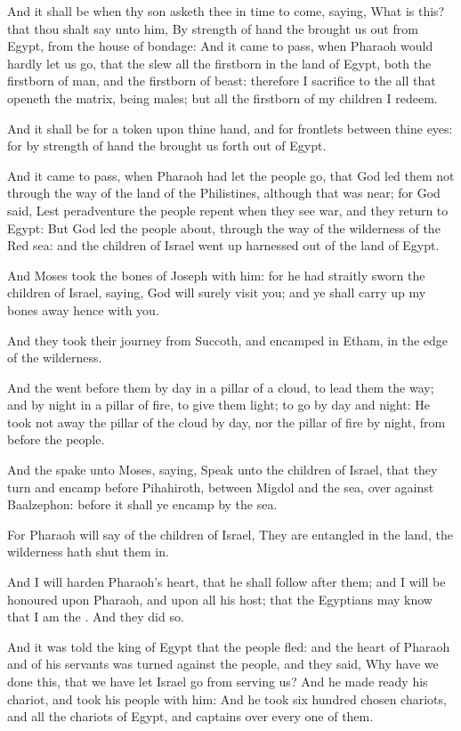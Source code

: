 \Verse And it shall be when thy son asketh thee in time to come, saying, What is this? that thou shalt say unto him, By strength of hand the \LORD brought us out from Egypt, from the house of bondage: \Verse And it came to pass, when Pharaoh would hardly let us go, that the \LORD slew all the firstborn in the land of Egypt, both the firstborn of man, and the firstborn of beast: therefore I sacrifice to the \LORD all that openeth the matrix, being males; but all the firstborn of my children I redeem.

\Verse And it shall be for a token upon thine hand, and for frontlets between thine eyes: for by strength of hand the \LORD brought us forth out of Egypt.

\Verse And it came to pass, when Pharaoh had let the people go, that God led them not through the way of the land of the Philistines, although that was near; for God said, Lest peradventure the people repent when they see war, and they return to Egypt: \Verse But God led the people about, through the way of the wilderness of the Red sea: and the children of Israel went up harnessed out of the land of Egypt.

\Verse And Moses took the bones of Joseph with him: for he had straitly sworn the children of Israel, saying, God will surely visit you; and ye shall carry up my bones away hence with you.

\Verse And they took their journey from Succoth, and encamped in Etham, in the edge of the wilderness.

\Verse And the \LORD went before them by day in a pillar of a cloud, to lead them the way; and by night in a pillar of fire, to give them light; to go by day and night: \Verse He took not away the pillar of the cloud by day, nor the pillar of fire by night, from before the people.

\Chapter
\Verse And the \LORD spake unto Moses, saying, \Verse Speak unto the children of Israel, that they turn and encamp before Pihahiroth, between Migdol and the sea, over against Baalzephon: before it shall ye encamp by the sea.

\Verse For Pharaoh will say of the children of Israel, They are entangled in the land, the wilderness hath shut them in.

\Verse And I will harden Pharaoh's heart, that he shall follow after them; and I will be honoured upon Pharaoh, and upon all his host; that the Egyptians may know that I am the \LORD. And they did so.

\Verse And it was told the king of Egypt that the people fled: and the heart of Pharaoh and of his servants was turned against the people, and they said, Why have we done this, that we have let Israel go from serving us?  \Verse And he made ready his chariot, and took his people with him: \Verse And he took six hundred chosen chariots, and all the chariots of Egypt, and captains over every one of them.

